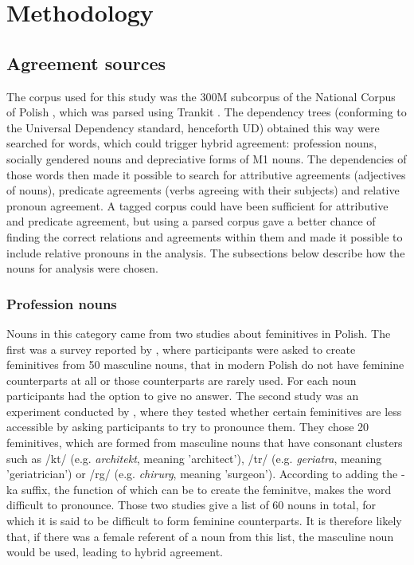 
\chapter{Methodology}

\startcontents[chapters]

\section{Agreement sources}
The corpus used for this study was the 300M subcorpus of the National Corpus of Polish \citep{przepiorkowski_narodowy_2012}, which was parsed using Trankit \citep{nguyen_trankit_2021}. The dependency trees (conforming to the Universal Dependency standard, henceforth UD) obtained this way were searched for words, which could trigger hybrid agreement: profession nouns, socially gendered nouns and depreciative forms of M1 nouns. The dependencies of those words then made it possible to search for attributive agreements (adjectives of nouns), predicate agreements (verbs agreeing with their subjects) and relative pronoun agreement. A tagged corpus could have been sufficient for attributive and predicate agreement, but using a parsed corpus gave a better chance of finding the correct relations and agreements within them and made it possible to include relative pronouns in the analysis. The subsections below describe how the nouns for analysis were chosen.

\subsection{Profession nouns}
Nouns in this category came from two studies about feminitives in Polish. The first was a survey reported by \cite{szpyra-kozlowska_premiera_2019}, where participants were asked to create feminitives from 50 masculine nouns, that in modern Polish do not have feminine counterparts at all or those counterparts are rarely used. For each noun participants had the option to give no answer. The second study was an experiment conducted by \cite{szpyra-kozlowska_czy_2022}, where they tested whether certain feminitives are less accessible by asking participants to try to pronounce them. They chose 20 feminitives, which are formed from masculine nouns that have consonant clusters such as /kt/ (e.g. \textsl{architekt}, meaning 'architect'), /tr/ (e.g. \textsl{geriatra}, meaning 'geriatrician') or /rg/ (e.g. \textsl{chirurg}, meaning 'surgeon'). According to \cite{klemensiewicz_tytuly_1957} adding the -ka suffix, the function of which can be to create the feminitve, makes the word difficult to pronounce. Those two studies give a list of 60 nouns in total, for which it is said to be difficult to form feminine counterparts. It is therefore likely that, if there was a female referent of a noun from this list, the masculine noun would be used, leading to hybrid agreement. 

